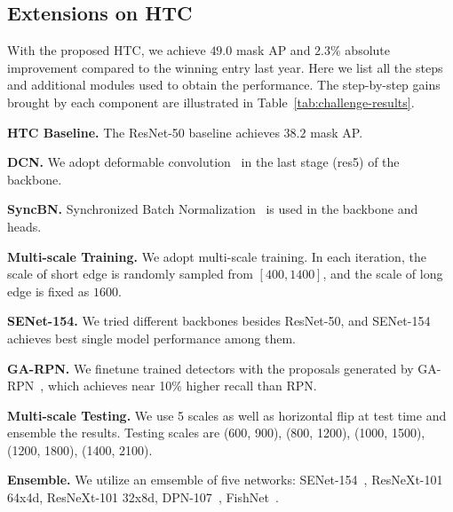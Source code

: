 \documentclass[10pt,twocolumn,letterpaper]{article}
\begin{document}
\subsection{Extensions on HTC}

With the proposed HTC, we achieve $49.0$ mask AP and $2.3\%$ absolute improvement compared to the winning entry last year.
Here we list all the steps and additional modules used to obtain the performance.
The step-by-step gains brought by each component are illustrated in Table~\ref{tab:challenge-results}.

\noindent\textbf{HTC Baseline.}
The ResNet-50 baseline achieves $38.2$ mask AP.

\noindent\textbf{DCN.}
We adopt deformable convolution~\cite{dai2017deformable} in the last stage (res5) of the backbone.

\noindent\textbf{SyncBN.}
Synchronized Batch Normalization~\cite{peng2018megdet,liu2018path} is used in the backbone and heads.

\noindent\textbf{Multi-scale Training.}
We adopt multi-scale training. In each iteration, the scale of short edge is randomly sampled from $[400, 1400]$, and the scale of long edge is fixed as $1600$.

\noindent\textbf{SENet-154.}
We tried different backbones besides ResNet-50, and SENet-154~\cite{Hu_2018_CVPR} achieves best single model performance among them.

\noindent\textbf{GA-RPN.}
We finetune trained detectors with the proposals generated by GA-RPN~\cite{wang2019region},
which achieves near 10\% higher recall than RPN.

\noindent\textbf{Multi-scale Testing.}
We use 5 scales as well as horizontal flip at test time and ensemble the results.
Testing scales are (600, 900), (800, 1200), (1000, 1500), (1200, 1800), (1400, 2100).

\noindent\textbf{Ensemble.}
We utilize an emsemble of five networks: SENet-154~\cite{Hu_2018_CVPR}, ResNeXt-101~\cite{xie2017aggregated} 64x4d, ResNeXt-101 32x8d, DPN-107~\cite{chen2017dual}, FishNet~\cite{fishnet_18_nips}.
\end{document}
